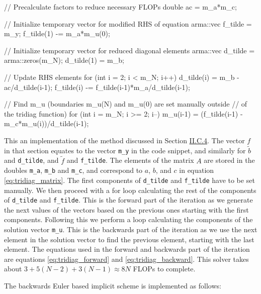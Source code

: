 \documentclass[reprint,english,notitlepage]{revtex4-1}  %
\begin{document}
\begin{cpp}
// Precalculate factors to reduce necessary FLOPs
double ac = m_a*m_c;

// Initialize temporary vector for modified RHS of equation
arma::vec f_tilde = m_y;
f_tilde(1) -= m_a*m_u(0);

// Initialize temporary vector for reduced diagonal elements
arma::vec d_tilde = arma::zeros(m_N);
d_tilde(1) = m_b;

// Update RHS elements
for (int i = 2; i < m_N; i++){
  d_tilde(i) = m_b - ac/d_tilde(i-1);
  f_tilde(i) -= f_tilde(i-1)*m_a/d_tilde(i-1);
}

// Find m_u (boundaries m_u(N) and m_u(0) are set manually outside
// of the tridiag function)
for (int i = m_N; i >= 2; i--){
  m_u(i-1) = (f_tilde(i-1) - m_c*m_u(i))/d_tilde(i-1);
}
\end{cpp} 

This an implementation of the method discussed in Section \hyperref[sec:formalism_tridiagonal_solver]{II.C.4}. The vector $f$ in that section equates to the vector \verb+m_y+ in the code snippet, and similarly for $\tilde{b}$ and \verb+d_tilde+, and $\tilde{f}$ and \verb+f_tilde+. The elements of the matrix $A$ are stored in the doubles \verb+m_a+, \verb+m_b+ and \verb+m_c+, and correspond to $a$, $b$, and $c$ in equation \eqref{eq:tridiag_matrix}. The first components of \verb+d_tilde+ and \verb+f_tilde+ have to be set manually. We then proceed with a for loop calculating the rest of the components of \verb+d_tilde+ and \verb+f_tilde+. This is the forward part of the iteration as we generate the next values of the vectors based on the previous ones starting with the first components. Following this we perform a loop calculating the components of the solution vector \verb+m_u+. This is the backwards part of the iteration as we use the next element in the solution vector to find the previous element, starting with the last element. The equations used in the forward and backwards part of the iteration are equations \eqref{eq:tridiag_forward} and \eqref{eq:tridiag_backward}. This solver takes about $3 + 5(N-2) + 3(N-1) \approx 8N$ FLOPs to complete. 

The backwards Euler based implicit scheme is implemented as follows:

\begin{cpp}
// Iterate over timesteps
for (int j = 1; j <= m_M; j++){
  // Use tridiagonal solver to move one step
  tridiag();

  // Set boundary conditions
  m_u(0) = m_lb;
  m_u(m_N) = m_ub;

  // Update previous solution
  m_y = m_u;
  }
}
\end{cpp}  
\end{document}
